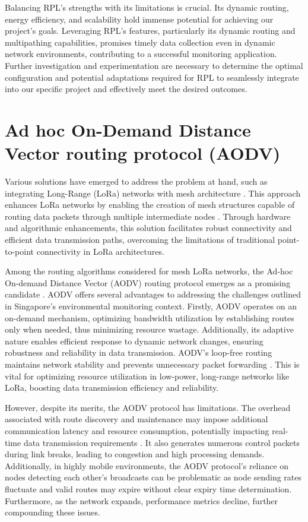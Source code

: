 Balancing RPL's strengths with its limitations is crucial. Its dynamic routing, energy efficiency, and scalability hold immense potential for achieving our project's goals. Leveraging RPL's features, particularly its dynamic routing and multipathing capabilities, promises timely data collection even in dynamic network environments, contributing to a successful monitoring application. Further investigation and experimentation are necessary to determine the optimal configuration and potential adaptations required for RPL to seamlessly integrate into our specific project and effectively meet the desired outcomes.

\section*{Ad hoc On-Demand Distance Vector routing protocol (AODV)}\label{sec:lit_review}

Various solutions have emerged to address the problem at hand, such as integrating Long-Range (LoRa) networks with mesh architecture \cite{8326735, s21134314}. This approach enhances LoRa networks by enabling the creation of mesh structures capable of routing data packets through multiple intermediate nodes \cite{8324573}. Through hardware and algorithmic enhancements, this solution facilitates robust connectivity and efficient data transmission paths, overcoming the limitations of traditional point-to-point connectivity in LoRa architectures.

Among the routing algorithms considered for mesh LoRa networks, the Ad-hoc On-demand Distance Vector (AODV) routing protocol emerges as a promising candidate \cite{BELDINGROYER2003125}. AODV offers several advantages to addressing the challenges outlined in Singapore's environmental monitoring context. Firstly, AODV operates on an on-demand mechanism, optimizing bandwidth utilization by establishing routes only when needed, thus minimizing resource wastage. Additionally, its adaptive nature enables efficient response to dynamic network changes, ensuring robustness and reliability in data transmission. AODV's loop-free routing maintains network stability and prevents unnecessary packet forwarding \cite{10.1145/313451.313538}. This is vital for optimizing resource utilization in low-power, long-range networks like LoRa, boosting data transmission efficiency and reliability.

However, despite its merits, the AODV protocol has limitations. The overhead associated with route discovery and maintenance may impose additional communication latency and resource consumption, potentially impacting real-time data transmission requirements \cite{Bhardwaj_2020}. It also generates numerous control packets during link breaks, leading to congestion and high processing demands. Additionally, in highly mobile environments, the AODV protocol's reliance on nodes detecting each other's broadcasts can be problematic as node sending rates fluctuate and valid routes may expire without clear expiry time determination. Furthermore, as the network expands, performance metrics decline, further compounding these issues.

